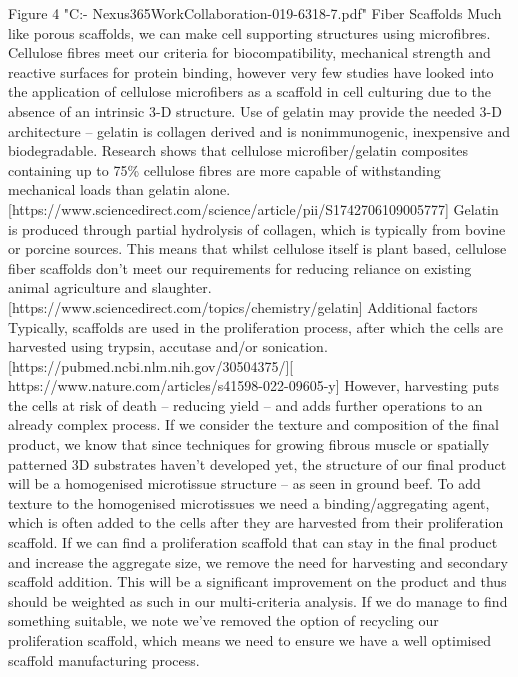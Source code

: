 Figure 4 "C:\Users\will\OneDrive - Nexus365\Eng{}\Group Work\Project Collaboration\Will{}-019-6318-7.pdf"
Fiber Scaffolds
Much like porous scaffolds, we can make cell supporting structures using microfibres. Cellulose fibres meet our criteria for biocompatibility, mechanical strength and reactive surfaces for protein binding, however very few studies have looked into the application of cellulose microfibers as a scaffold in cell culturing due to the absence of an intrinsic 3-D structure. Use of gelatin may provide the needed 3-D architecture – gelatin is collagen derived and is nonimmunogenic, inexpensive and biodegradable. Research shows that cellulose microfiber/gelatin composites containing up to 75\% cellulose fibres are more capable of withstanding mechanical loads than gelatin alone.
[https://www.sciencedirect.com/science/article/pii/S1742706109005777]
Gelatin is produced through partial hydrolysis of collagen, which is typically from bovine or porcine sources. This means that whilst cellulose itself is plant based, cellulose fiber scaffolds don’t meet our requirements for reducing reliance on existing animal agriculture and slaughter.
[https://www.sciencedirect.com/topics/chemistry/gelatin]
Additional factors
Typically, scaffolds are used in the proliferation process, after which the cells are harvested using trypsin, accutase and/or sonication. [https://pubmed.ncbi.nlm.nih.gov/30504375/][ https://www.nature.com/articles/s41598-022-09605-y] However, harvesting puts the cells at risk of death – reducing yield – and adds further operations to an already complex process. If we consider the texture and composition of the final product, we know that since techniques for growing fibrous muscle or spatially patterned 3D substrates haven’t developed yet, the structure of our final product will be a homogenised microtissue structure – as seen in ground beef. To add texture to the homogenised microtissues we need a binding/aggregating agent, which is often added to the cells after they are harvested from their proliferation scaffold.
If we can find a proliferation scaffold that can stay in the final product and increase the aggregate size, we remove the need for harvesting and secondary scaffold addition. This will be a significant improvement on the product and thus should be weighted as such in our multi-criteria analysis. If we do manage to find something suitable, we note we’ve removed the option of recycling our proliferation scaffold, which means we need to ensure we have a well optimised scaffold manufacturing process.  

